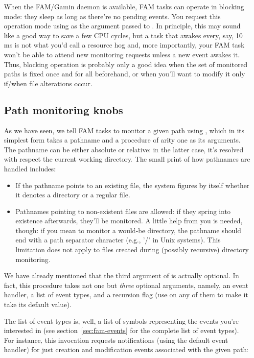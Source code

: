 When the FAM/Gamin daemon is available, FAM tasks can operate in
blocking mode: they sleep as long as there're no pending events. You
request this operation mode using  as the argument passed to
. In principle, this may sound like a good way to
save a few CPU cycles, but a task that awakes every, say, 10 ms is not
what you'd call a resource hog and, more importantly, your FAM task
won't be able to attend new monitoring requests unless a new event
awakes it. Thus, blocking operation is probably only a good idea when
the set of monitored paths is fixed once and for all beforehand, or
when you'll want to modify it only if/when file alterations occur.

\subsection{Path monitoring knobs}
\label{sec:path-monit-knobs}

As we have seen, we tell FAM tasks to monitor a given path using
, which in its simplest form takes a pathname
and a procedure of arity one as its arguments. The pathname can be
either absolute or relative: in the latter case, it's resolved with
respect the current working directory. The small print of how
pathnames are handled includes:
\begin{itemize}
\item If the pathname points to an existing file, the system figures
  by itself whether it denotes a directory or a regular file.
\item Pathnames pointing to non-existent files are allowed: if they
  spring into existence afterwards, they'll be monitored. A little
  help from you is needed, though: if you mean to monitor a would-be
  directory, the pathname should end with a path separator character
  (e.g., '/' in Unix systems). This limitation does not apply to files
  created during (possibly recursive) directory monitoring.
\end{itemize}
We have already mentioned that the third argument of
 is actually optional. In fact, this procedure
takes not one but \textit{three} optional arguments, namely, an event
handler, a list of event types, and a recursion flag (use  on
any of them to make it take its default value).

The list of event types is, well, a list of symbols representing the
events you're interested in (see section~\ref{sec:fam-events} for the
complete list of event types). For instance, this invocation requests
notifications (using the default event handler) for just creation and
modification events associated with the given path:

